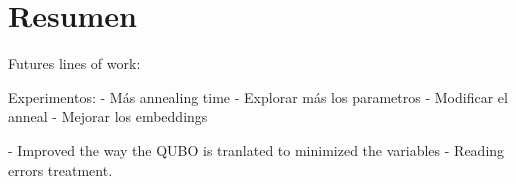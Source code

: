 \chapter*{Resumen}

Futures lines of work:

Experimentos:
	- Más annealing time
	- Explorar más los parametros
	- Modificar el anneal
	- Mejorar los embeddings
	


- Improved the way the QUBO is tranlated to minimized the variables
- Reading errors treatment.